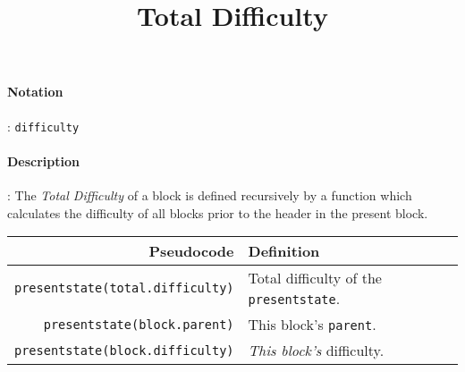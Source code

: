 \documentclass[10pt,a4paper,oneside]{scrartcl}
\author{}
\title{Total Difficulty}
\date{}
\begin{document}
\maketitle
\paragraph{Notation}: \texttt{difficulty}
\paragraph{Description}: The \textit{Total Difficulty} of a block is defined recursively by a function which calculates the difficulty of all blocks prior to the header in the present block.
        	\par
                \begin{tabular}{rl}
           \toprule
           \textbf{Pseudocode} & \textbf{Definition} \\
           \midrule
           \texttt{presentstate(total.difficulty)} & Total difficulty of the \texttt{presentstate}. \\
	   \texttt{presentstate(block.parent)}     & This block's \texttt{parent}. \\
           \texttt{presentstate(block.difficulty)} & \textsl{This block's} difficulty. \\
           \bottomrule
                  \end{tabular}
 
\end{document}
